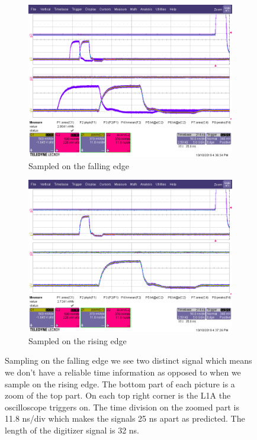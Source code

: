 \begin{figure}[htbp!]
\centering
\begin{subfigure}{.5\textwidth}
  \centering
  \includegraphics[width=1.0\linewidth]{TLBsamplingPhaseAsynchronous.png}
  \caption{Sampled on the falling edge}
  \label{fig:SamplingPhaseFalling}
\end{subfigure}%
\begin{subfigure}{.5\textwidth}
  \centering
  \includegraphics[width=1.0\linewidth]{TLBsamplingPhaseSynchronous.png}
  \caption{Sampled on the rising edge}
  \label{fig:SamplingPhaseRising}
\end{subfigure}
\caption[Sampling Phase]{Sampling on the falling edge we see two distinct signal which means we don't have a reliable time information as opposed to when we sample on the rising edge. The bottom part of each picture is a zoom of the top part. On each top right corner is the L1A the oscilloscope triggers on. The time division on the zoomed part is 11.8 ns/div which makes the signals 25
 ns apart as predicted. The length of the digitizer signal is 32 ns.}
\label{fig:SamplingPhaseResults}
\end{figure}


